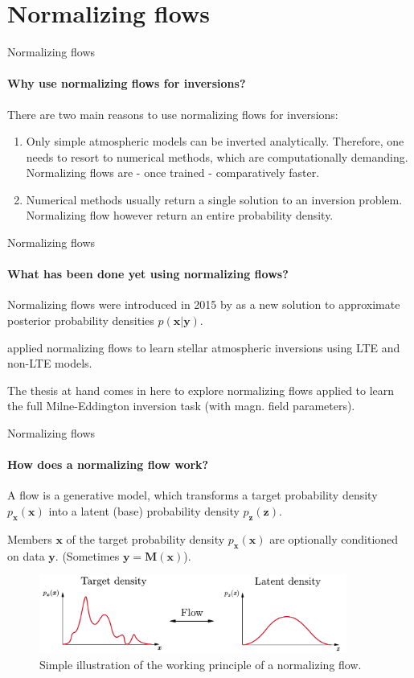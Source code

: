 \documentclass{beamer}
\newcommand\vect[1]{\ensuremath{\bm{#1}}}
\begin{document}
\section{Normalizing flows}
\begin{frame}[allowframebreaks]{Normalizing flows}
\framesubtitle{Why use normalizing flows for inversions?}
There are two main reasons to use normalizing flows for inversions:
\begin{enumerate}
\item Only simple atmospheric models can be inverted analytically. Therefore, one needs to resort to numerical methods, which are computationally demanding. Normalizing flows are - once trained - comparatively faster.
\item Numerical methods usually return a single solution to an inversion problem. Normalizing flow however return an entire probability density.
\end{enumerate}
\end{frame}

\begin{frame}[allowframebreaks]{Normalizing flows}
	\framesubtitle{What has been done yet using normalizing flows?}
Normalizing flows were introduced in 2015 by \cite{Rezende.21.05.2015} as a new solution to approximate posterior probability densities $p(\vect{x}|\vect{y})$.

\cite{DiazBaso.2022} applied normalizing flows to learn stellar atmospheric inversions using LTE and non-LTE models.

The thesis at hand comes in here to explore normalizing flows applied to learn the full Milne-Eddington inversion task (with magn. field parameters).
\end{frame}

\begin{frame}[allowframebreaks]{Normalizing flows}
\framesubtitle{How does a normalizing flow work?}
A flow is a generative model, which transforms a target probability density $p_{\vect{x}}(\vect{x})$ into a latent (base) probability density $p_{\vect{z}}(\vect{z})$.

Members $\vect{x}$ of the target probability density $p_{\vect{x}}(\vect{x})$ are optionally conditioned on data $\vect{y}$. (Sometimes $\vect{y} = \vect{M}(\vect{x})$).

\begin{figure}[h!]
	\centering
	\includegraphics[width=0.9\textwidth]{figures/presentation/flowsimple.pdf}
	\caption{Simple illustration of the working principle of a normalizing flow.}
	\label{fig:flowsimple}
\end{figure}
\end{frame}
\end{document}
